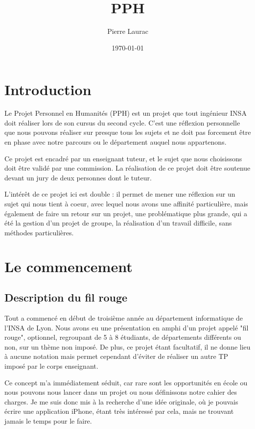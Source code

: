 \documentclass{article}
\title{PPH}
\author{Pierre Laurac}
\date\today
\begin{document}
\maketitle

\newpage
\tableofcontents
\newpage
\section{Introduction}
Le Projet Personnel en Humanités (PPH) est un projet que tout ingénieur INSA doit réaliser lors de son cursus du second cycle. C'est une réflexion personnelle que nous pouvons réaliser sur presque tous les sujets et ne doit pas forcement être en phase avec notre parcours ou le département auquel nous appartenons.

Ce projet est encadré par un enseignant tuteur, et le sujet que nous choisissons doit être validé par une commission. La réalisation de ce projet doit être soutenue devant un jury de deux personnes dont le tuteur. 

L'intérêt de ce projet ici est double : il permet de mener une réflexion sur un sujet qui nous tient à coeur, avec lequel nous avons une affinité particulière, mais également de faire un retour sur un projet, une problématique plus grande, qui a été la gestion d'un projet de groupe, la réalisation d'un travail difficile, sans méthodes particulières.
\section{Le commencement}
\subsection{Description du fil rouge}
	Tout a commencé en début de troisième année au département informatique de l'INSA de Lyon. Nous avons eu une présentation en amphi d'un projet appelé "fil rouge", optionnel, regroupant de 5 à 8 étudiants, de départements différents ou non, sur un thème non imposé. De plus, ce projet étant facultatif, il ne donne lieu à aucune notation mais permet cependant d'éviter de réaliser un autre TP imposé par le corps enseignant.
	
	Ce concept m’a immédiatement séduit, car rare sont les opportunités en école ou nous pouvons nous lancer dans un projet ou nous définissons notre cahier des charges. Je me suis donc mis à la recherche d’une idée originale, où je pouvais écrire une application iPhone, étant très intéressé par cela, mais ne trouvant jamais le temps pour le faire.
	
\end{document}

